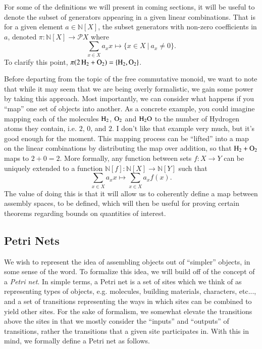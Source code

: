 \documentclass[aps,prd,onecolumn,nofootinbib,letterpaper,preprintnumbers,superscriptaddress,eqsecnum]{revtex4}
\theoremstyle{definition}
\newcommand{\N}{\mathbb{N}}
\newcommand{\powerset}{\mathcal{P}}
\newcommand{\red}[1]{{\color{red}#1}}
\begin{document}
For some of the definitions we will present in coming sections, it will be useful to denote the subset of generators appearing in a given linear combinations. That is for a given element $a \in \N[X]$, the subset generators with non-zero coefficients in $a$, denoted $\pi : \N[X] \rightarrow \powerset{X}$ where
\begin{equation*}
    \displaystyle \sum_{x \in X} a_x x \mapsto \{ x \in X ~|~ a_x \ne 0 \}.
\end{equation*}
To clarify this point, $\pi(\ce{2H2} + \ce{O_2}) = \{\ce{H_2}, \ce{O_2}\}$.

Before departing from the topic of the free commutative monoid, we want to note that while it may seem that we are being overly formalistic, we gain some power by taking this approach.
Most importantly, we can consider what happens if you ``map'' one set of objects into another.
As a concrete example, you could imagine mapping each of the molecules $\ce{H_2}$, $\ce{O_2}$ and $\ce{H_2O}$ to the number of Hydrogen atoms they contain, i.e. $2$, $0$, and $2$.
\red{I don't like that example very much, but it's good enough for the moment.}
This mapping process can be ``lifted'' into a map on the linear combinations by distributing the map over addition, so that $\ce{H_2} + \ce{O_2}$ maps to $2 + 0 = 2$. More formally, any function between sets $f : X \rightarrow Y$ can be uniquely extended to a function $\N[f] : \N[X] \rightarrow \N[Y]$ such that
\begin{equation*}
    \sum_{x \in X} a_x x \mapsto \sum_{x \in X} a_x f(x).
\end{equation*}
The value of doing this is that it will allow us to coherently define a map between assembly spaces, to be defined, which will then be useful for proving certain theorems regarding bounds on quantities of interest.

\subsection{Petri Nets}

We wish to represent the idea of assembling objects out of ``simpler'' objects, in some sense of the word.
To formalize this idea, we will build off of the concept of a \textit{Petri net}.
In simple terms, a Petri net is a set of sites which we think of as representing types of objects, e.g. molecules, building materials, characters, etc..., and a set of transitions representing the ways in which sites can be combined to yield other sites.
For the sake of formalism, we somewhat elevate the transitions above the sites in that we mostly consider the ``inputs'' and ``outputs'' of transitions, rather the transitions that a given site participates in.
With this in mind, we formally define a Petri net as follows.
\end{document}
